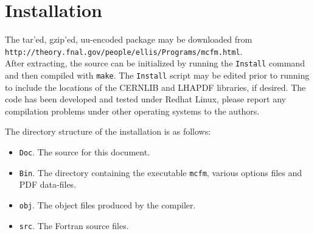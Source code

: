 \documentclass[12pt]{article}
\begin{document}
\def\GeV{\mbox{GeV}}

\section{Installation}

The tar'ed, gzip'ed, uu-encoded package may be downloaded from \\
{\tt http://theory.fnal.gov/people/ellis/Programs/mcfm.html}. \\
After extracting, the source can be initialized by running the
{\tt Install} command and then compiled with {\tt make}. The
{\tt Install} script may be edited prior to running to include
the locations of the CERNLIB and LHAPDF libraries, if desired.
The code has been developed and tested under Redhat Linux, please report
any compilation problems under other operating systems to the authors.

The directory structure of the installation is as follows:
\begin{itemize}
\item {\tt Doc}. The source for this document.
\item {\tt Bin}. The directory containing the executable {\tt mcfm},
various options files and PDF data-files.
\item {\tt obj}. The object files produced by the compiler. 
\item {\tt src}. The Fortran source files. 
\end{itemize}
\end{document}
